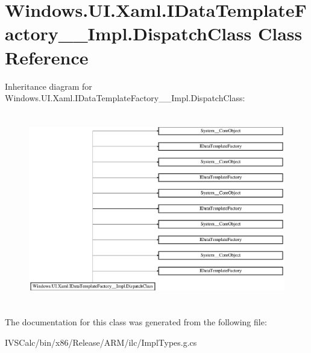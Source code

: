 \hypertarget{class_windows_1_1_u_i_1_1_xaml_1_1_i_data_template_factory_____impl_1_1_dispatch_class}{}\section{Windows.\+U\+I.\+Xaml.\+I\+Data\+Template\+Factory\+\_\+\+\_\+\+Impl.\+Dispatch\+Class Class Reference}
\label{class_windows_1_1_u_i_1_1_xaml_1_1_i_data_template_factory_____impl_1_1_dispatch_class}
Inheritance diagram for Windows.\+U\+I.\+Xaml.\+I\+Data\+Template\+Factory\+\_\+\+\_\+\+Impl.\+Dispatch\+Class\+:\begin{figure}[H]
\begin{center}
\leavevmode
\includegraphics[height=8.461538cm]{class_windows_1_1_u_i_1_1_xaml_1_1_i_data_template_factory_____impl_1_1_dispatch_class}
\end{center}
\end{figure}


The documentation for this class was generated from the following file\+:\begin{DoxyCompactItemize}
\item 
I\+V\+S\+Calc/bin/x86/\+Release/\+A\+R\+M/ilc/Impl\+Types.\+g.\+cs\end{DoxyCompactItemize}
